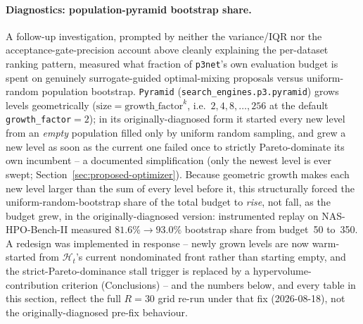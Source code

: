 \paragraph{Diagnostics: population-pyramid bootstrap share.} A follow-up investigation, prompted by neither
the variance/IQR nor the acceptance-gate-precision account above cleanly explaining the per-dataset ranking
pattern, measured what fraction of \texttt{p3net}'s own evaluation budget is spent on genuinely
surrogate-guided optimal-mixing proposals versus uniform-random population bootstrap. \texttt{Pyramid}
(\texttt{search\_engines.p3.pyramid}) grows levels geometrically ($\text{size} = \text{growth\_factor}^{k}$,
i.e.\ $2, 4, 8, \dots, 256$ at the default \texttt{growth\_factor}$=2$); in its originally-diagnosed form it
started every new level from an \emph{empty} population filled only by uniform random sampling, and grew a
new level as soon as the current one failed once to strictly Pareto-dominate its own incumbent -- a
documented simplification (only the newest level is ever swept; Section~\ref{sec:proposed-optimizer}).
Because geometric growth makes each new level larger than the sum of every level before it, this
structurally forced the uniform-random-bootstrap share of the total budget to \emph{rise}, not fall, as the
budget grew, in the originally-diagnosed version: instrumented replay on NAS-HPO-Bench-II measured
$81.6\%\to93.0\%$ bootstrap share from budget~50 to~350. A redesign was implemented in response -- newly
grown levels are now warm-started from $\mathcal{H}_t$'s current nondominated front rather than starting
empty, and the strict-Pareto-dominance stall trigger is replaced by a hypervolume-contribution criterion
(Conclusions) -- and the numbers below, and every table in this section, reflect the full $R=30$ grid
re-run under that fix (2026-08-18), not the originally-diagnosed pre-fix behaviour.


